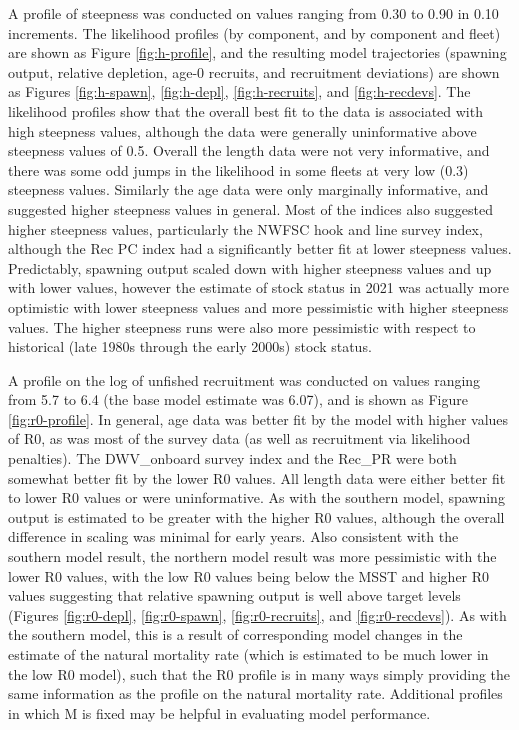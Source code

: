 \documentclass[11pt,
  english,
]{article}
\begin{document}
A profile of steepness was conducted on values ranging from 0.30 to 0.90 in 0.10 increments. The likelihood profiles (by component, and by component and fleet) are shown as Figure \ref{fig:h-profile}, and the resulting model trajectories (spawning output, relative depletion, age-0 recruits, and recruitment deviations) are shown as Figures \ref{fig:h-spawn}, \ref{fig:h-depl}, \ref{fig:h-recruits}, and \ref{fig:h-recdevs}. The likelihood profiles show that the overall best fit to the data is associated with high steepness values, although the data were generally uninformative above steepness values of 0.5. Overall the length data were not very informative, and there was some odd jumps in the likelihood in some fleets at very low (0.3) steepness values. Similarly the age data were only marginally informative, and suggested higher steepness values in general. Most of the indices also suggested higher steepness values, particularly the NWFSC hook and line survey index, although the Rec PC index had a significantly better fit at lower steepness values. Predictably, spawning output scaled down with higher steepness values and up with lower values, however the estimate of stock status in 2021 was actually more optimistic with lower steepness values and more pessimistic with higher steepness values. The higher steepness runs were also more pessimistic with respect to historical (late 1980s through the early 2000s) stock status.

A profile on the log of unfished recruitment was conducted on values ranging from 5.7 to 6.4 (the base model estimate was 6.07), and is shown as Figure \ref{fig:r0-profile}. In general, age data was better fit by the model with higher values of R0, as was most of the survey data (as well as recruitment via likelihood penalties). The DWV\_onboard survey index and the Rec\_PR were both somewhat better fit by the lower R0 values. All length data were either better fit to lower R0 values or were uninformative. As with the southern model, spawning output is estimated to be greater with the higher R0 values, although the overall difference in scaling was minimal for early years. Also consistent with the southern model result, the northern model result was more pessimistic with the lower R0 values, with the low R0 values being below the MSST and higher R0 values suggesting that relative spawning output is well above target levels (Figures \ref{fig:r0-depl}, \ref{fig:r0-spawn}, \ref{fig:r0-recruits}, and \ref{fig:r0-recdevs}). As with the southern model, this is a result of corresponding model changes in the estimate of the natural mortality rate (which is estimated to be much lower in the low R0 model), such that the R0 profile is in many ways simply providing the same information as the profile on the natural mortality rate. Additional profiles in which M is fixed may be helpful in evaluating model performance.
\end{document}
